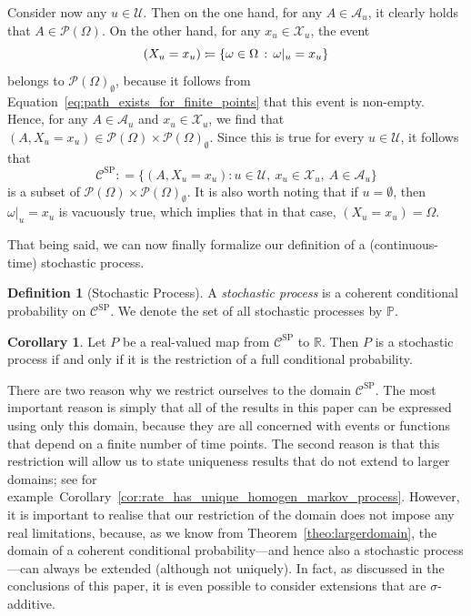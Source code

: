 \documentclass[10pt,a4paper]{paper}
\theoremstyle{definition}
\newtheorem{corollary}[theorem]{Corollary}
\newtheorem{definition}{Definition}
\newcommand{\reals}{\mathbb{R}}
\newcommand{\states}{\mathcal{X}}
\newcommand{\paths}{\Omega}
\newcommand{\power}{\mathcal{P}(\paths)}
\newcommand{\nonemptypower}{\power_{\emptyset}}
\newcommand{\processes}{\mathbb{P}}
\newcommand{\coloneqq}{:\!=}
\begin{document}
Consider now any $u\in\mathcal{U}$. Then on the one hand, for any $A\in\mathcal{A}_u$, it clearly holds that $A\in\power$. On the other hand, for any $x_u\in\states_u$, the event
\begin{equation*}
(X_u=x_u) \coloneqq \{\omega\in\Omega\,:\,\omega\vert_u=x_u\}
\vspace{4pt}
\end{equation*}
belongs to $\nonemptypower$, because it follows from Equation~\eqref{eq:path_exists_for_finite_points} that this event is non-empty. 
Hence, for any $A\in\mathcal{A}_u$ and $x_u\in\states_u$, we find that $(A,X_u=x_u)\in\power\times\nonemptypower$. Since this is true for every $u\in\mathcal{U}$, it follows that
\begin{equation*}
\mathcal{C}^\mathrm{SP}\coloneqq\big\{
(A,X_u=x_u)
\colon
u\in\mathcal{U},~x_u\in\states_u,~A\in\mathcal{A}_u\big\}
\end{equation*}
is a subset of $\power\times\nonemptypower$. It is also worth noting that if $u=\emptyset$, then $\omega\vert_u=x_u$ is vacuously true, which implies that in that case, $(X_u=x_u)=\Omega$.


That being said, we can now finally formalize our definition of a (continuous-time) stochastic process.

\begin{definition}[Stochastic Process]\label{def:stoch_process}
A \emph{stochastic process} is a coherent conditional probability on $\mathcal{C}^\mathrm{SP}$. We denote the set of all stochastic processes by $\processes$.
\end{definition}


\begin{corollary}\label{corol:processiffrestriction}
Let $P$ be a real-valued map from $\mathcal{C}^\mathrm{SP}$ to $\reals$. Then $P$ is a stochastic process if and only if it is the restriction of a full conditional probability.
\end{corollary}

There are two reason why we restrict ourselves to the domain $\mathcal{C}^\mathrm{SP}$. The most important reason is simply that all of the results in this paper can be expressed using only this domain, because they are all concerned with events or functions that depend on a finite number of time points. The second reason is that this restriction will allow us to state  uniqueness results that do not extend to larger domains; see for example~Corollary~\ref{cor:rate_has_unique_homogen_markov_process}. However, it is important to realise that our restriction of the domain does not impose any real limitations, because, as we know from Theorem~\ref{theo:largerdomain}, the domain of a coherent conditional probability---and hence also a stochastic process---can always be extended (although not uniquely). In fact, as discussed in the conclusions of this paper, it is even possible to consider extensions that are $\sigma$-additive.
\end{document}
